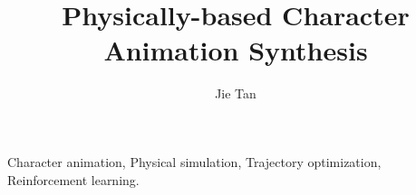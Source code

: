 \documentclass[graybox]{svmult}
\begin{document}
\title*{Physically-based Character Animation Synthesis}
\author{Jie Tan}
%
%
\maketitle

\begin{keywords}
Character animation, Physical simulation, Trajectory optimization, Reinforcement learning.
  \end{keywords}





%


\end{document}
